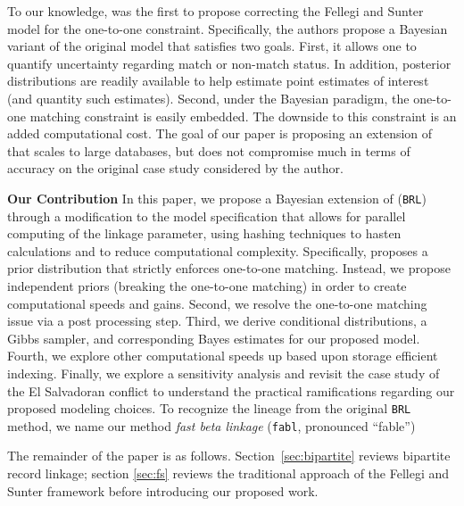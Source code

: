 \documentclass[12pt,letterpaper]{article}
\newcommand{\1}[1]{\mathbb{I}\!\left[#1\right]} %
\begin{document}
To our knowledge, \cite{sadinle_bayesian_2017} was the first to propose correcting the Fellegi and Sunter model for the one-to-one constraint. Specifically, the authors propose a Bayesian variant of the original model that satisfies two goals. First, it allows one to quantify uncertainty regarding match or non-match status. In addition, posterior distributions are readily available to help estimate point estimates of interest (and quantity such estimates). Second, under the Bayesian paradigm, the one-to-one matching constraint is easily embedded. The downside to this constraint is an added computational cost. The goal of our paper is proposing an extension of \cite{sadinle_bayesian_2017} that scales to large databases, but does not compromise much in terms of accuracy on the original case study considered by the author. 

\textbf{Our Contribution} 
In this paper, we propose a Bayesian extension of \cite{sadinle_bayesian_2017} (\texttt{BRL}) through a modification to the model specification that allows for parallel computing of the linkage parameter, using hashing techniques to hasten calculations and to reduce computational complexity.  Specifically, \cite{sadinle_bayesian_2017} proposes a prior distribution that strictly enforces one-to-one matching. Instead, we propose independent priors (breaking the one-to-one matching) in order to create computational speeds and gains. Second, we resolve the one-to-one matching issue via a post processing step. Third, we derive conditional distributions, a Gibbs sampler, and corresponding Bayes estimates for our proposed model. Fourth, we explore other computational speeds up based upon storage efficient indexing. Finally, we explore a sensitivity analysis and revisit the case study of the El Salvadoran conflict to understand the practical ramifications regarding our proposed modeling choices. 
To recognize the lineage from the original \texttt{BRL} method, we name our method \emph{fast beta linkage} (\texttt{fabl},
pronounced ``fable'')

The remainder of the paper is as follows. Section~\ref{sec:bipartite} reviews bipartite record linkage; section \ref{sec:fs} reviews the traditional approach of the Fellegi and Sunter framework before introducing our proposed work. 
\end{document}
